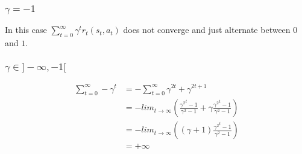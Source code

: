 \subsubsection{$\gamma = -1$}

In this case $\sum^\infty_{t=0} \gamma^t r_t(s_t, a_t)$ does not converge and just alternate between $0$ and $1$.

\subsubsection{$\gamma \in ]-\infty, -1[ $}

\begin{align*}
    \sum^\infty_{t=0} - \gamma^t &= - \sum^\infty_{t=0} \gamma^{2t} + \gamma^{2t+1} \\
    &= -lim_{t \rightarrow \infty} \left( \frac{{\gamma^2}^t - 1}{\gamma^2 - 1} + \gamma \frac{{\gamma^2}^t - 1}{\gamma^2 - 1} \right) \\
    &= -lim_{t \rightarrow \infty} \left( (\gamma + 1) \frac{{\gamma^2}^t - 1}{\gamma^2 - 1} \right) \\
    &= + \infty
\end{align*}


